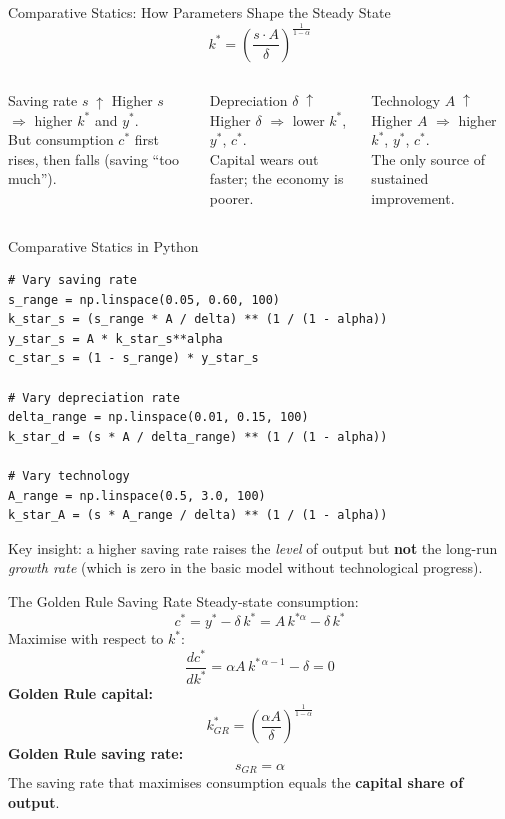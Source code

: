 \documentclass[aspectratio=169, 10pt]{beamer}
\begin{document}
\begin{frame}{Comparative Statics: How Parameters Shape the Steady State}
\[
  k^* = \left(\frac{s \cdot A}{\delta}\right)^{\!\frac{1}{1-\alpha}}
\]
\vspace{0.3em}
\begin{columns}[T]
\begin{block}{Saving rate $s\;\uparrow$}
  Higher $s$ $\Rightarrow$ higher $k^*$ and $y^*$.\\[4pt]
  But consumption $c^*$ first rises, then falls (saving ``too much'').
\end{block}
\begin{block}{Depreciation $\delta\;\uparrow$}
  Higher $\delta$ $\Rightarrow$ lower $k^*$, $y^*$, $c^*$.\\[4pt]
  Capital wears out faster; the economy is poorer.
\end{block}
\begin{block}{Technology $A\;\uparrow$}
  Higher $A$ $\Rightarrow$ higher $k^*$, $y^*$, $c^*$.\\[4pt]
  The \alert{only source} of sustained improvement.
\end{block}
\end{columns}
\end{frame}

\begin{frame}[fragile]{Comparative Statics in Python}
\begin{lstlisting}
# Vary saving rate
s_range = np.linspace(0.05, 0.60, 100)
k_star_s = (s_range * A / delta) ** (1 / (1 - alpha))
y_star_s = A * k_star_s**alpha
c_star_s = (1 - s_range) * y_star_s

# Vary depreciation rate
delta_range = np.linspace(0.01, 0.15, 100)
k_star_d = (s * A / delta_range) ** (1 / (1 - alpha))

# Vary technology
A_range = np.linspace(0.5, 3.0, 100)
k_star_A = (s * A_range / delta) ** (1 / (1 - alpha))
\end{lstlisting}
\vspace{0.3em}
Key insight: a higher saving rate raises the \textit{level} of output
but \textbf{not} the long-run \textit{growth rate} (which is zero in
the basic model without technological progress).
\end{frame}

\begin{frame}{The Golden Rule Saving Rate}
Steady-state consumption:
\[
  c^* = y^* - \delta\,k^* = A\,k^{*\alpha} - \delta\,k^*
\]
Maximise with respect to $k^*$:
\[
  \frac{dc^*}{dk^*} = \alpha A\,k^{*\,\alpha - 1} - \delta = 0
\]
\vspace{0.3em}
\textbf{Golden Rule capital:}
\[
  k^*_{GR} = \left(\frac{\alpha A}{\delta}\right)^{\!\frac{1}{1-\alpha}}
\]
\textbf{Golden Rule saving rate:}
\[
  \boxed{s_{GR} = \alpha}
\]
The saving rate that \alert{maximises consumption} equals the
\textbf{capital share of output}.
\end{frame}
\end{document}

